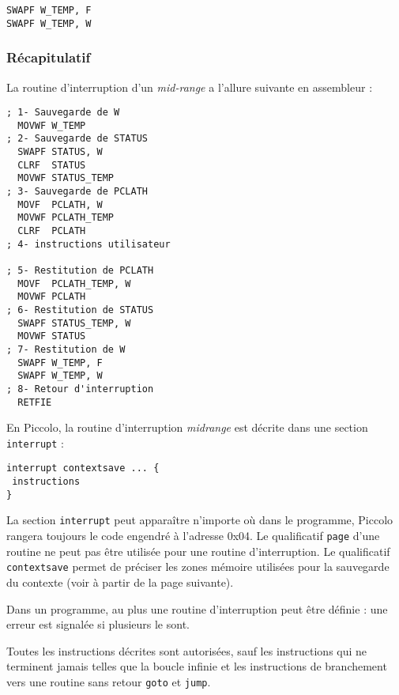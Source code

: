 \begin{lstlisting}[language=assembleur]
SWAPF W_TEMP, F
SWAPF W_TEMP, W
\end{lstlisting}





\subsubsection{Récapitulatif}

La routine d'interruption d'un \emph{mid-range} a l'allure suivante en assembleur :

\begin{lstlisting}[language=assembleur]
; 1- Sauvegarde de W
  MOVWF W_TEMP 
; 2- Sauvegarde de STATUS
  SWAPF STATUS, W
  CLRF  STATUS
  MOVWF STATUS_TEMP 
; 3- Sauvegarde de PCLATH
  MOVF  PCLATH, W
  MOVWF PCLATH_TEMP 
  CLRF  PCLATH
; 4- instructions utilisateur

; 5- Restitution de PCLATH
  MOVF  PCLATH_TEMP, W
  MOVWF PCLATH 
; 6- Restitution de STATUS
  SWAPF STATUS_TEMP, W
  MOVWF STATUS
; 7- Restitution de W
  SWAPF W_TEMP, F
  SWAPF W_TEMP, W
; 8- Retour d'interruption
  RETFIE
\end{lstlisting}








En Piccolo, la routine d’interruption \emph{midrange} est décrite dans une section \texttt{interrupt} :

\begin{lstlisting}[language=piccolo]
interrupt contextsave ... {
 instructions
}
\end{lstlisting}

La section \texttt{interrupt} peut apparaître n’importe où dans le programme, Piccolo rangera toujours le code engendré à l’adresse 0x04. Le qualificatif \texttt{page} d’une routine ne peut pas être utilisée pour une routine d’interruption. Le qualificatif \texttt{contextsave} permet de préciser les zones mémoire utilisées pour la sauvegarde du contexte (voir à partir de la page suivante).

Dans un programme, au plus une routine d’interruption peut être définie : une erreur est signalée si plusieurs le sont.

Toutes les instructions décrites sont autorisées, sauf les instructions qui ne terminent jamais telles que la boucle infinie et les instructions de branchement vers une routine sans retour \texttt{goto} et \texttt{jump}.


